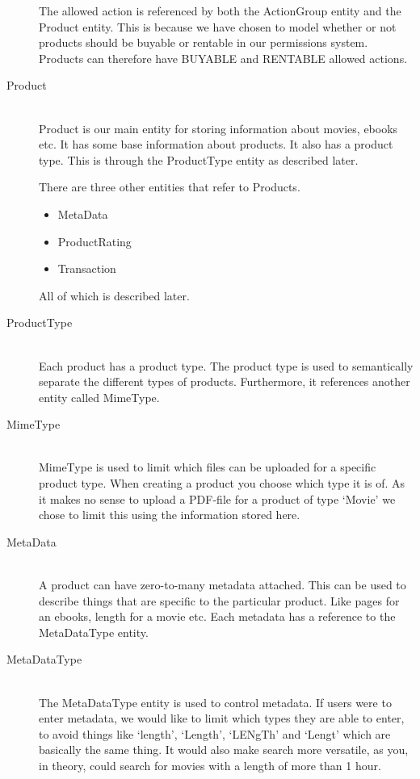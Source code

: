 \begin{description}
The allowed action is referenced by both the ActionGroup entity and the Product entity. This is because we have chosen to model whether or not products should be buyable or rentable in our permissions system. Products can therefore have BUYABLE and RENTABLE allowed actions.

\item[Product] \hfill \\ 
Product is our main entity for storing information about movies, ebooks etc. It has some base information about products. It also has a product type. This is through the ProductType entity as described later.

There are three other entities that refer to Products.
\begin{itemize}
	\item MetaData
	\item ProductRating
	\item Transaction
\end{itemize}
All of which is described later.

\item[ProductType] \hfill \\
Each product has a product type. The product type is used to semantically separate the different types of products. Furthermore, it references another entity called MimeType.

\item[MimeType] \hfill \\
MimeType is used to limit which files can be uploaded for a specific product type. When creating a product you choose which type it is of. As it makes no sense to upload a PDF-file for a product of type `Movie' we chose to limit this using the information stored here.

\item[MetaData] \hfill \\
A product can have zero-to-many metadata attached. This can be used to describe things that are specific to the particular product. Like pages for an ebooks, length for a movie etc. Each metadata has a reference to the MetaDataType entity.

\item[MetaDataType] \hfill \\
The MetaDataType entity is used to control metadata. If users were to enter metadata, we would like to limit which types they are able to enter, to avoid things like `length', `Length', `LENgTh' and `Lengt' which are basically the same thing. It would also make search more versatile, as you, in theory, could search for movies with a length of more than 1 hour.


\end{description}
